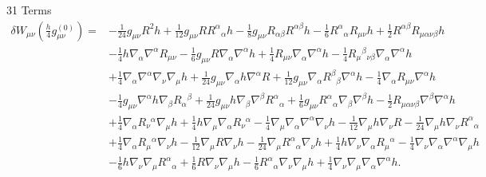 \documentclass[10pt,letterpaper]{article}
\begin{document}
31 Terms
\begin{align}
\delta W_{\mu\nu}(\tfrac{h}{4}g_{\mu\nu}^{(0)})={}&- \tfrac{1}{24} g_{\mu \nu} R^2 h
 + \tfrac{1}{12} g_{\mu \nu} R R^{\alpha}{}_{\alpha} h
 -  \tfrac{1}{8} g_{\mu \nu} R_{\alpha \beta} R^{\alpha \beta} h
 -  \tfrac{1}{6} R^{\alpha}{}_{\alpha} R_{\mu \nu} h
 + \tfrac{1}{2} R^{\alpha \beta} R_{\mu \alpha \nu \beta} h\nonumber\\
& -  \tfrac{1}{4} h \nabla_{\alpha}\nabla^{\alpha}R_{\mu \nu}
 -  \tfrac{1}{6} g_{\mu \nu} R \nabla_{\alpha}\nabla^{\alpha}h
 + \tfrac{1}{4} R_{\mu \nu} \nabla_{\alpha}\nabla^{\alpha}h
 -  \tfrac{1}{4} R_{\mu}{}^{\beta}{}_{\nu \beta} \nabla_{\alpha}\nabla^{\alpha}h\nonumber\\
& + \tfrac{1}{4} \nabla_{\alpha}\nabla^{\alpha}\nabla_{\nu}\nabla_{\mu}h
 + \tfrac{1}{24} g_{\mu \nu} \nabla_{\alpha}h \nabla^{\alpha}R
 + \tfrac{1}{12} g_{\mu \nu} \nabla_{\alpha}R^{\beta}{}_{\beta} \nabla^{\alpha}h
 -  \tfrac{1}{4} \nabla_{\alpha}R_{\mu \nu} \nabla^{\alpha}h\nonumber\\
& -  \tfrac{1}{4} g_{\mu \nu} \nabla^{\alpha}h \nabla_{\beta}R_{\alpha}{}^{\beta}
 + \tfrac{1}{24} g_{\mu \nu} h \nabla_{\beta}\nabla^{\beta}R^{\alpha}{}_{\alpha}
 + \tfrac{1}{6} g_{\mu \nu} R^{\alpha}{}_{\alpha} \nabla_{\beta}\nabla^{\beta}h
 -  \tfrac{1}{2} R_{\mu \alpha \nu \beta} \nabla^{\beta}\nabla^{\alpha}h\nonumber\\
& + \tfrac{1}{4} \nabla_{\alpha}R_{\nu}{}^{\alpha} \nabla_{\mu}h
 + \tfrac{1}{4} h \nabla_{\mu}\nabla_{\alpha}R_{\nu}{}^{\alpha}
 -  \tfrac{1}{4} \nabla_{\mu}\nabla_{\alpha}\nabla^{\alpha}\nabla_{\nu}h
 -  \tfrac{1}{12} \nabla_{\mu}h \nabla_{\nu}R
 -  \tfrac{1}{24} \nabla_{\mu}h \nabla_{\nu}R^{\alpha}{}_{\alpha}\nonumber\\
& + \tfrac{1}{4} \nabla_{\alpha}R_{\mu}{}^{\alpha} \nabla_{\nu}h
 -  \tfrac{1}{12} \nabla_{\mu}R \nabla_{\nu}h
 -  \tfrac{1}{24} \nabla_{\mu}R^{\alpha}{}_{\alpha} \nabla_{\nu}h
 + \tfrac{1}{4} h \nabla_{\nu}\nabla_{\alpha}R_{\mu}{}^{\alpha}
 -  \tfrac{1}{4} \nabla_{\nu}\nabla_{\alpha}\nabla^{\alpha}\nabla_{\mu}h\nonumber\\
& -  \tfrac{1}{6} h \nabla_{\nu}\nabla_{\mu}R^{\alpha}{}_{\alpha}
 + \tfrac{1}{6} R \nabla_{\nu}\nabla_{\mu}h
 -  \tfrac{1}{6} R^{\alpha}{}_{\alpha} \nabla_{\nu}\nabla_{\mu}h
 + \tfrac{1}{4} \nabla_{\nu}\nabla_{\mu}\nabla_{\alpha}\nabla^{\alpha}h.
\end{align}
\end{document}
